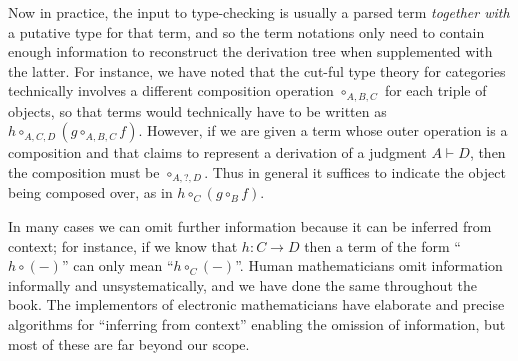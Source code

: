 \documentclass{book}
\let\types\vdash
\newcommand{\atom}{\mathrel{\downarrow}}
\newcommand{\can}{\mathrel{\uparrow}}
\begin{document}
Now in practice, the input to type-checking is usually a parsed term \emph{together with} a putative type for that term, and so the term notations only need to contain enough information to reconstruct the derivation tree when supplemented with the latter.
For instance, we have noted that the cut-ful type theory for categories technically involves a different composition operation $\circ_{A,B,C}$ for each triple of objects, so that terms would technically have to be written as $h\circ_{A,C,D} (g\circ_{A,B,C} f)$.
However, if we are given a term whose outer operation is a composition and that claims to represent a derivation of a judgment $A\types D$, then the composition must be $\circ_{A,?,D}$.
Thus in general it suffices to indicate the object being composed over, as in $h\circ_C (g\circ_B f)$.

\begin{rmk}
In many cases we can omit further information because it can be inferred from context; for instance, if we know that $h:C\to D$ then a term of the form ``$h\circ (-)$'' can only mean ``$h\circ_C (-)$''.
Human mathematicians omit information informally and unsystematically, and we have done the same throughout the book.
The implementors of electronic mathematicians have elaborate and precise algorithms for ``inferring from context'' enabling the omission of information, but most of these are far beyond our scope.
\end{rmk}
\end{document}

